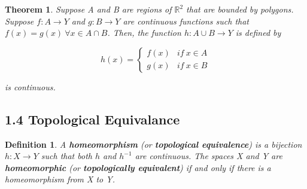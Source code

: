\documentclass[executivepaper]{article}
\newtheorem{definition}{Definition}
\newtheorem{theorem}{Theorem}
\begin{document}
\vspace{2mm}

\begin{tcolorbox}

\begin{theorem}

\textit{Suppose A and B are regions of $\mathbb{R}^{2}$ that are bounded by polygons. Suppose $f: A \rightarrow Y$ and $g: B \rightarrow Y$ are continuous functions such that $f(x)=g(x) ~ \forall x \in A \cap B$. Then, the function $h: A \cup B \rightarrow Y$ is defined by}

\begin{center}

\[h(x)= \begin{cases} 
      f(x) & if ~ x \in A \\
      g(x) & if ~ x \in B
   \end{cases}
\]

\end{center}

is continuous.

\end{theorem}

\end{tcolorbox}

\subsection*{1.4 Topological Equivalance}

\begin{tcolorbox}

\begin{definition}

\textit{A \textbf{homeomorphism} (or \textbf{topological equivalence}) is a bijection $h: X \rightarrow Y$ such that both $h$ and $h^{-1}$ are continuous. The spaces X and Y are \textbf{homeomorphic} (or \textbf{topologically equivalent}) if and only if there is a homeomorphism from X to Y.}

\end{definition}

\end{tcolorbox}

\vspace{2mm}
\end{document}
